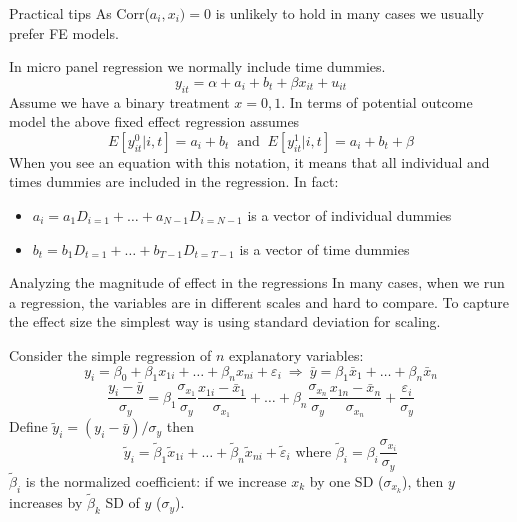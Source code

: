 \documentclass{beamer}
\begin{document}
\begin{frame}{Practical tips}
As Corr($a_i,x_i)=0$ is unlikely to hold in many cases we usually prefer FE models.\medskip

In micro panel regression we normally include time dummies. 
\[y_{it} = \alpha+a_i+ b_t + \beta x_{it}+u_{it} \]
Assume we have a binary treatment $x=0,1$. In terms of potential outcome model the above fixed effect regression assumes
\[ E[y^0_{it}|i,t]=a_i+b_t \ \text{  and  } \ E[y^1_{it}|i,t]=a_i+b_t+\beta  \]
When you see an equation with this notation, it means that all individual and times dummies are included in the regression. In fact:
\begin{itemize}
\item $a_i=a_1D_{i=1}+\dots+a_{N-1}D_{i=N-1}$ is a vector of individual dummies
\item $b_t=b_1D_{t=1}+\dots+b_{T-1}D_{t=T-1}$ is a vector of time dummies
\end{itemize} 
\end{frame}

\begin{frame}{Analyzing the magnitude of effect in the regressions}
In many cases, when we run a regression, the variables are in different scales and hard to compare.
To capture the effect size the simplest way is using standard deviation for scaling. \medskip

Consider the simple regression of $n$ explanatory variables:
\[y_i=\beta_0+\beta_1x_{1i}+\dots+\beta_nx_{ni}+\varepsilon_i \ \Rightarrow \ \bar{y}=\beta_1\bar{x}_1+\dots+\beta_n\bar{x}_n \]
\[\frac{y_i-\bar{y}}{\sigma_y}=\beta_1\frac{\sigma_{x_1}}{\sigma_y}\frac{x_{1i}-\bar{x}_1}{\sigma_{x_1}}+\dots+\beta_n\frac{\sigma_{x_n}}{\sigma_y}\frac{x_{1n}-\bar{x}_n}{\sigma_{x_n}} +\frac{\varepsilon_i}{\sigma_y}\]
Define $\tilde{y}_i=(y_i-\bar{y})/\sigma_y$ then \[\tilde{y}_i=\tilde{\beta}_1\tilde{x}_{1i}+\dots+\tilde{\beta}_n\tilde{x}_{ni}+\tilde{\varepsilon}_i \text{ where } \tilde{\beta}_i=\beta_i\frac{\sigma_{x_i}}{\sigma_y} \]
$\tilde{\beta}_i$ is the normalized coefficient: if we increase $x_k$ by one SD ($\sigma_{x_k}$), then $y$ increases by $\tilde{\beta}_k$ SD of $y$ ($\sigma_{y}$).
\end{frame}
\end{document}
